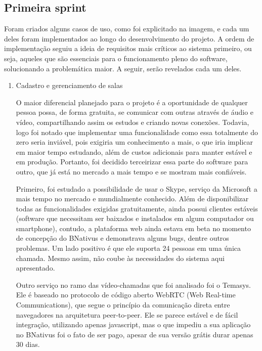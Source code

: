\subsection{Primeira sprint}

Foram criados alguns casos de uso, como foi explicitado na imagem, e cada um deles foram implementados ao longo do desenvolvimento do projeto. A ordem de implementação seguiu a ideia de requisitos mais críticos ao sistema primeiro, ou seja, aqueles que são essenciais para o funcionamento pleno do software, solucionando a problemática maior. A seguir, serão revelados cada um deles.

 \begin{enumerate}
   \item Cadastro e gerenciamento de salas
   
    O maior diferencial planejado	 para o projeto é a oportunidade de qualquer pessoa possa, de forma gratuita, se comunicar com outras através de áudio e vídeo, compartilhando assim os estudos e criando novas conexões. Todavia, logo foi notado que implementar uma funcionalidade como essa totalmente do zero seria inviável, pois exigiria um conhecimento a mais, o que iria implicar em maior tempo estudando, além de custos adicionais para manter estável e em produção. Portanto, foi decidido terceirizar essa parte do software para outro, que já está no mercado a mais tempo e se mostram mais confiáveis.

    Primeiro, foi estudado a possibilidade de usar o Skype, serviço da Microsoft a mais tempo no mercado e mundialmente conhecido. Além de disponibilizar todas as funcionalidades exigidas gratuitamente, ainda possui clientes estáveis (software que necessitam ser baixados e instalados em algum computador ou smartphone), contudo, a plataforma web ainda estava em beta no momento de concepção do BNativus e demonstrava alguns bugs, dentre outros problemas. Um lado positivo é que ele suporta 24 pessoas em uma única chamada. Mesmo assim, não coube às necessidades do sistema aqui apresentado. 
    
    Outro serviço no ramo das vídeo-chamadas que foi analisado foi o Temasys. Ele é baseado no protocolo de código aberto WebRTC (Web Real-time Communications), que segue o princípio da comunicação direta entre navegadores na arquitetura peer-to-peer. Ele se parece estável e de fácil integração, utilizando apenas javascript, mas o que impediu a sua aplicação no BNativus foi o fato de ser pago, apesar de sua versão grátis durar apenas 30 dias.
    

\end{enumerate}
